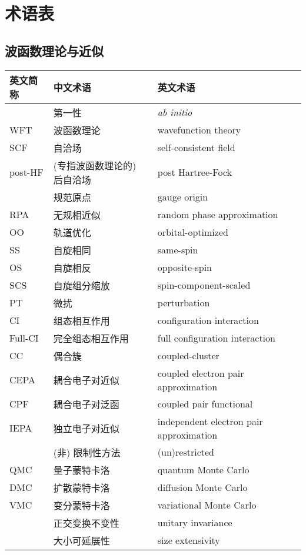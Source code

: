
\chapter{术语表}

\section*{波函数理论与近似}

\begingroup
\setlength{\LTleft}{-20cm plus -1fill}
\setlength{\LTright}{\LTleft}

\begin{longtable}{lll}
    \hline 英文简称 & 中文术语 & 英文术语 \\ \hline \endhead
    \hline \endfoot
    & 第一性 & \emph{ab initio} \\
    WFT & 波函数理论 & wavefunction theory \\
    SCF & 自洽场 & self-consistent field \\
    post-HF & (专指波函数理论的) 后自洽场 & post Hartree-Fock \\
    & 规范原点 & gauge origin \\
    RPA & 无规相近似 & random phase approximation \\
    OO & 轨道优化 & orbital-optimized \\
    SS & 自旋相同 & same-spin \\
    OS & 自旋相反 & opposite-spin \\
    SCS & 自旋组分缩放 & spin-component-scaled \\
    PT & 微扰 & perturbation \\
    CI & 组态相互作用 & configuration interaction \\
    Full-CI & 完全组态相互作用 & full configuration interaction \\
    CC & 偶合簇 & coupled-cluster \\
    CEPA & 耦合电子对近似 & coupled electron pair approximation \\
    CPF & 耦合电子对泛函 & coupled pair functional \\
    IEPA & 独立电子对近似 & independent electron pair approximation \\
    & (非) 限制性方法 & (un)restricted \\
    QMC & 量子蒙特卡洛 & quantum Monte Carlo \\
    DMC & 扩散蒙特卡洛 & diffusion Monte Carlo \\
    VMC & 变分蒙特卡洛 & variational Monte Carlo \\
    & 正交变换不变性 & unitary invariance \\
    & 大小可延展性 & size extensivity \\
\end{longtable}

